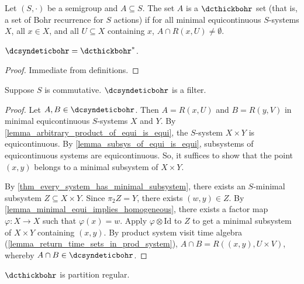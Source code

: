 \begin{definition}
\label{def_dcthickbohr}
\leanok{}
Let $(S,\cdot)$ be a semigroup and $A \subseteq S$. The set $A$ is a $\dcthickbohr$ set (that is, a set of Bohr recurrence for $S$ actions) if for all minimal equicontinuous $S$-systems $X$, all $x \in X$, and all $U \subseteq X$ containing $x$, $A \cap R(x,U) \neq \emptyset$.
\end{definition}

\begin{lemma}
    \label{lemma_dcsyndeticbohr_dcthickbohr_dual}
    \leanok{}
    $\dcsyndeticbohr = \dcthickbohr^*$.
\end{lemma}

\begin{proof}
    Immediate from definitions.
\end{proof}

\begin{lemma}
    \label{lemma_dcsyndeticbohr_is_filter}
    \leanok{}
    Suppose $S$ is commutative. $\dcsyndeticbohr$ is a filter.
\end{lemma}

\begin{proof}
    Let $A, B \in \dcsyndeticbohr$.  Then $A = R(x,U)$ and $B = R(y,V)$ in minimal equicontinuous $S$-systems $X$ and $Y$.  By \cref{lemma_arbitrary_product_of_equi_is_equi}, the $S$-system $X \times Y$ is equicontinuous.  By \cref{lemma_subsys_of_equi_is_equi}, subsystems of equicontinuous systems are equicontinuous.  So, it suffices to show that the point $(x,y)$ belongs to a minimal subsystem of $X \times Y$.

    By \cref{thm_every_system_has_minimal_subsystem}, there exists an $S$-minimal subsystem $Z \subseteq X \times Y$.  Since $\pi_2 Z = Y$, there exists $(w,y) \in Z$.  By \cref{lemma_minimal_equi_implies_homogeneous}, there exists a factor map $\varphi: X \to X$ such that $\varphi(x) = w$.  Apply $\varphi \otimes \text{Id}$ to $Z$ to get a minimal subsystem of $X \times Y$ containing $(x,y)$. By product system visit time algebra (\cref{lemma_return_time_sets_in_prod_system}), $A \cap B = R((x,y), U \times V)$, whereby $A \cap B \in \dcsyndeticbohr$.
\end{proof}

\begin{lemma}
    \label{lemma_dcthickbohr_is_pr}
    \leanok{}
    $\dcthickbohr$ is partition regular.
\end{lemma}


